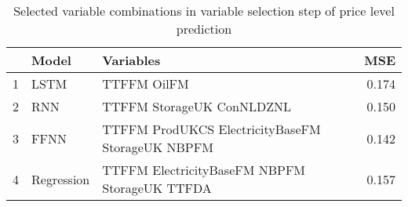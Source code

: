 \begin{table}[ht]
\centering
\begin{tabular}{rllr}
  \hline
 & Model & Variables & MSE \\ 
  \hline
1 & LSTM & TTFFM OilFM & 0.174 \\ 
  2 & RNN & TTFFM StorageUK ConNLDZNL & 0.150 \\ 
  3 & FFNN & TTFFM ProdUKCS ElectricityBaseFM StorageUK NBPFM & 0.142 \\ 
  4 & Regression & TTFFM ElectricityBaseFM NBPFM StorageUK TTFDA & 0.157 \\ 
   \hline
\end{tabular}
\caption{Selected variable combinations in variable selection step of price level prediction} 
\label{tab:level.var.selection.short}
\end{table}
